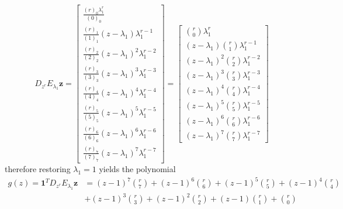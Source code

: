 \begin{displaymath}
D_{{z}^{r}}E_{\lambda_{1}}\boldsymbol{z} = \left[\begin{matrix}\frac{{\left(r\right)}_{0} \lambda_{1}^{r}}{{\left(0\right)}_{0}}\\\frac{{\left(r\right)}_{1}}{{\left(1\right)}_{1}} \left(z - \lambda_{1}\right) \lambda_{1}^{r - 1}\\\frac{{\left(r\right)}_{2}}{{\left(2\right)}_{2}} \left(z - \lambda_{1}\right)^{2} \lambda_{1}^{r - 2}\\\frac{{\left(r\right)}_{3}}{{\left(3\right)}_{3}} \left(z - \lambda_{1}\right)^{3} \lambda_{1}^{r - 3}\\\frac{{\left(r\right)}_{4}}{{\left(4\right)}_{4}} \left(z - \lambda_{1}\right)^{4} \lambda_{1}^{r - 4}\\\frac{{\left(r\right)}_{5}}{{\left(5\right)}_{5}} \left(z - \lambda_{1}\right)^{5} \lambda_{1}^{r - 5}\\\frac{{\left(r\right)}_{6}}{{\left(6\right)}_{6}} \left(z - \lambda_{1}\right)^{6} \lambda_{1}^{r - 6}\\\frac{{\left(r\right)}_{7}}{{\left(7\right)}_{7}} \left(z - \lambda_{1}\right)^{7} \lambda_{1}^{r - 7}\end{matrix}\right]
 = \left[\begin{matrix}{\binom{r}{0}} \lambda_{1}^{r}\\\left(z - \lambda_{1}\right) {\binom{r}{1}} \lambda_{1}^{r - 1}\\\left(z - \lambda_{1}\right)^{2} {\binom{r}{2}} \lambda_{1}^{r - 2}\\\left(z - \lambda_{1}\right)^{3} {\binom{r}{3}} \lambda_{1}^{r - 3}\\\left(z - \lambda_{1}\right)^{4} {\binom{r}{4}} \lambda_{1}^{r - 4}\\\left(z - \lambda_{1}\right)^{5} {\binom{r}{5}} \lambda_{1}^{r - 5}\\\left(z - \lambda_{1}\right)^{6} {\binom{r}{6}} \lambda_{1}^{r - 6}\\\left(z - \lambda_{1}\right)^{7} {\binom{r}{7}} \lambda_{1}^{r - 7}\end{matrix}\right]
\end{displaymath}
therefore restoring $\lambda_{1}=1$ yields the polynomial
\begin{displaymath}
\begin{split}
g{\left (z \right )} = \boldsymbol{1}^{T}D_{{z}^{r}}E_{\lambda_{1}}\boldsymbol{z} &= \left(z - 1\right)^{7} {\binom{r}{7}} + \left(z - 1\right)^{6} {\binom{r}{6}} + \left(z - 1\right)^{5} {\binom{r}{5}} + \left(z - 1\right)^{4} {\binom{r}{4}} \\
                    &+ \left(z - 1\right)^{3} {\binom{r}{3}} + \left(z - 1\right)^{2} {\binom{r}{2}} + \left(z - 1\right) {\binom{r}{1}} + {\binom{r}{0}}
\end{split}
\end{displaymath}
